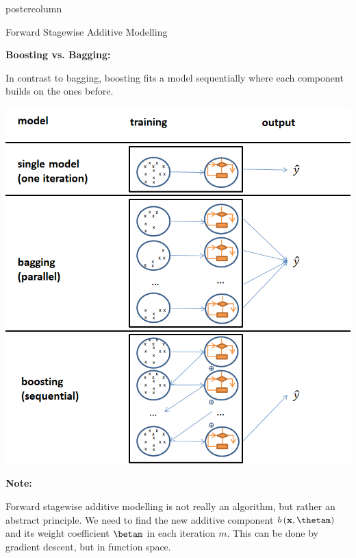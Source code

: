 \documentclass{beamer}
\begin{document}
\begin{frame}[fragile]{}
\begin{columns}
\begin{column}{.31\textwidth}
\begin{beamercolorbox}[center]{postercolumn}
\begin{minipage}{.98\textwidth}
{\begin{myblock}{Forward Stagewise Additive Modelling}
						  \begin{codebox}
                  \textbf{Boosting vs. Bagging: }
              \end{codebox}
						  In contrast to bagging, boosting fits a model sequentially where each component
              builds on the ones before.
              \begin{center}
                \includegraphics[width=0.5\columnwidth]{img/bagging_vs_boosting.png}
              \end{center}
              \begin{codebox}
                \textbf{Note: }
              \end{codebox}
              Forward stagewise additive modelling is not really an algorithm, but rather an
              abstract principle. We need to find the new additive component
              $b\left(\xv, \thetam\right)$ and its weight coefficient $\betam$ in each iteration
              $m$. This can be done by gradient descent, but in function space.
            \end{myblock}\vfill
				} %
			\end{minipage}
		\end{beamercolorbox}
	\end{column}



\end{columns}
\end{frame}
\end{document}
